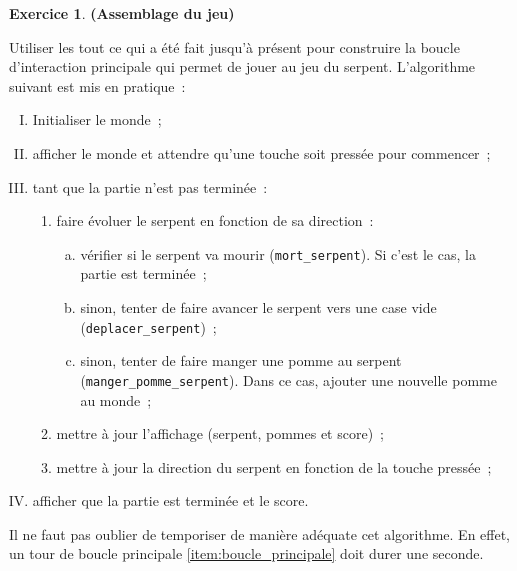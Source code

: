 \documentclass[11pt]{article}
\theoremstyle{definition}
\newtheorem{Exercice}{Exercice}
\begin{document}
\begin{Exercice} {\bf (Assemblage du jeu)}\smallskip

Utiliser les tout ce qui a été fait jusqu'à présent pour construire la
boucle d'interaction principale qui permet de jouer au jeu du serpent.
L'algorithme suivant est mis en pratique~:
\smallskip

\begin{enumerate}[(I)]
    \item Initialiser le monde~;
    \item afficher le monde et attendre qu'une touche soit pressée pour
    commencer~;
    \item \label{item:boucle_principale}
    tant que la partie n'est pas terminée~:
    \begin{enumerate}[(1)]
        \item faire évoluer le serpent en fonction de sa direction~:
        \begin{enumerate}[(a)]
            \item vérifier si le serpent va mourir ({\tt mort\_serpent}).
            Si c'est le cas, la partie est terminée~;
            \item sinon, tenter de faire avancer le serpent vers une case vide
            ({\tt deplacer\_serpent})~;
            \item sinon, tenter de faire manger une pomme au serpent
            ({\tt manger\_pomme\_serpent}).
            Dans ce cas, ajouter une nouvelle pomme au monde~;
        \end{enumerate}
        \item mettre à jour l'affichage (serpent, pommes et score)~;
        \item mettre à jour la direction du serpent en fonction de la
        touche pressée~;
    \end{enumerate}
    \item afficher que la partie est terminée et le score.
\end{enumerate}
\medskip

Il ne faut pas oublier de temporiser de manière adéquate cet
algorithme. En effet, un tour de boucle
principale \eqref{item:boucle_principale} doit durer une seconde.
\end{Exercice}
\bigskip
\end{document}
